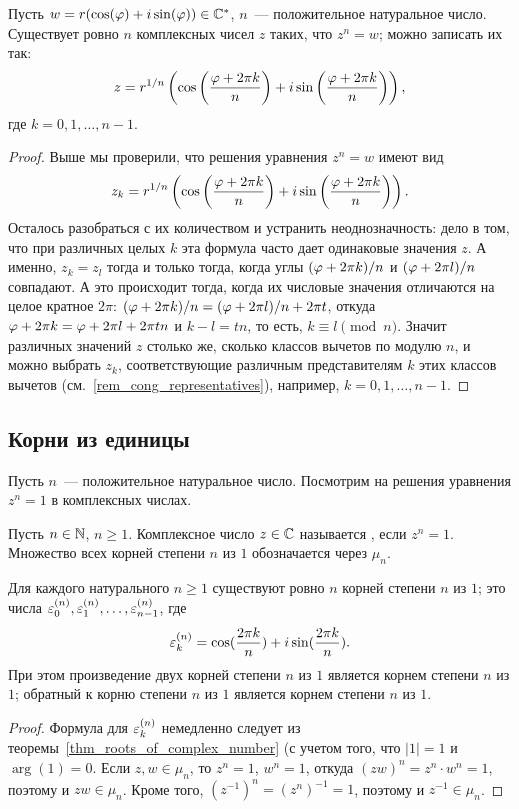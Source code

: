 \begin{theorem}\label{thm_roots_of_complex_number}
Пусть $w=r(\cos(\varphi)+i\sin(\varphi))\in\mathbb C^*$, $n$~--- положительное натуральное
число. Существует ровно $n$ комплексных чисел $z$ таких, что $z^n=w$;
можно записать их так:
$$
z=r^{1/n}\left(\cos\left(\frac{\varphi+2\pi k}{n}\right) +
  i\sin\left(\frac{\varphi+2\pi k}{n}\right)\right),
$$
где $k=0,1,\dots,n-1$.
\end{theorem}
\begin{proof}
Выше мы проверили, что решения уравнения $z^n=w$ имеют вид
$$
z_k=r^{1/n}\left(\cos\left(\frac{\varphi+2\pi k}{n}\right) +
  i\sin\left(\frac{\varphi+2\pi k}{n}\right)\right).
$$
Осталось разобраться с их количеством и устранить неоднозначность:
дело в том, что при различных целых $k$ эта формула часто дает
одинаковые значения $z$. А именно, $z_k=z_l$ тогда и только тогда,
когда углы $(\varphi+2\pi k)/n$ и $(\varphi+2\pi l)/n$ совпадают. А это
происходит тогда, когда их числовые значения отличаются на целое
кратное $2\pi$: $(\varphi+2\pi k)/n=(\varphi+2\pi l)/n+2\pi t$, откуда
$\varphi+2\pi k=\varphi+2\pi l+2\pi tn$ и $k-l=tn$, то есть, $k\equiv
l\pmod{n}$. Значит различных значений $z$ столько же, сколько классов
вычетов по модулю $n$, и можно выбрать $z_k$, соответствующие
различным представителям $k$ этих классов вычетов
(см.~\ref{rem_cong_representatives}), например, $k=0,1,\dots,n-1$.
\end{proof}

\subsection{Корни из единицы}


Пусть $n$~--- положительное натуральное число. Посмотрим на решения
уравнения $z^n=1$ в комплексных числах.

\begin{definition}
Пусть $n\in\mathbb N$, $n\geq 1$. Комплексное число $z\in\mathbb C$ называется
, если $z^n=1$. Множество всех корней
степени $n$ из $1$ обозначается через $\mu_n$.
\end{definition}

\begin{proposition}
Для каждого натурального $n\geq 1$ существуют ровно $n$ корней степени $n$
из $1$; это числа
$\varepsilon_0^{(n)},\varepsilon_1^{(n)},\dots,\varepsilon_{n-1}^{(n)}$, где
$$
\varepsilon_k^{(n)}=\cos(\frac{2\pi k}{n})+i\sin(\frac{2\pi k}{n}).
$$
При этом произведение двух корней степени $n$ из $1$ является корнем
степени $n$ из $1$; обратный к корню степени $n$ из $1$ является
корнем степени $n$ из $1$.
\end{proposition}
\begin{proof}
Формула для $\varepsilon_k^{(n)}$ немедленно следует из
теоремы~\ref{thm_roots_of_complex_number} (с учетом того, что $|1|=1$
и $\arg(1)=0$.
Если $z,w\in\mu_n$, то $z^n=1$,
$w^n=1$, откуда $(zw)^n=z^n\cdot w^n=1$, поэтому и $zw\in\mu_n$. Кроме
того, $(z^{-1})^n=(z^n)^{-1}=1$, поэтому и $z^{-1}\in\mu_n$.
\end{proof}

